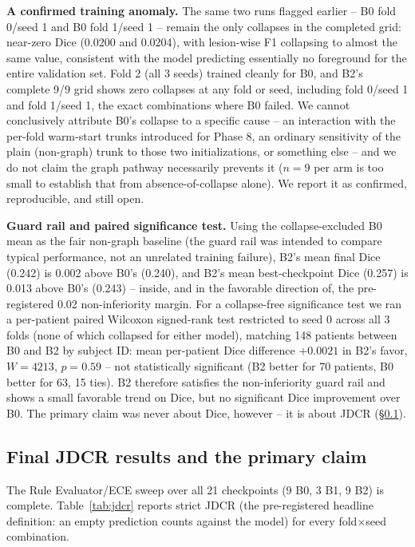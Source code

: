 \documentclass[conference]{IEEEtran}
\begin{document}
\textbf{A confirmed training anomaly.} The same two runs flagged earlier -- B0 fold 0/seed 1 and B0 fold 1/seed 1 -- remain the only collapses in the completed grid: near-zero Dice (0.0200 and 0.0204), with lesion-wise F1 collapsing to almost the same value, consistent with the model predicting essentially no foreground for the entire validation set. Fold 2 (all 3 seeds) trained cleanly for B0, and B2's complete 9/9 grid shows zero collapses at any fold or seed, including fold 0/seed 1 and fold 1/seed 1, the exact combinations where B0 failed. We cannot conclusively attribute B0's collapse to a specific cause -- an interaction with the per-fold warm-start trunks introduced for Phase 8, an ordinary sensitivity of the plain (non-graph) trunk to those two initializations, or something else -- and we do not claim the graph pathway necessarily prevents it ($n=9$ per arm is too small to establish that from absence-of-collapse alone). We report it as confirmed, reproducible, and still open.

\textbf{Guard rail and paired significance test.} Using the collapse-excluded B0 mean as the fair non-graph baseline (the guard rail was intended to compare typical performance, not an unrelated training failure), B2's mean final Dice (0.242) is 0.002 above B0's (0.240), and B2's mean best-checkpoint Dice (0.257) is 0.013 above B0's (0.243) -- inside, and in the favorable direction of, the pre-registered 0.02 non-inferiority margin. For a collapse-free significance test we ran a per-patient paired Wilcoxon signed-rank test restricted to seed 0 across all 3 folds (none of which collapsed for either model), matching 148 patients between B0 and B2 by subject ID: mean per-patient Dice difference $+0.0021$ in B2's favor, $W=4213$, $p=0.59$ -- not statistically significant (B2 better for 70 patients, B0 better for 63, 15 ties). B2 therefore satisfies the non-inferiority guard rail and shows a small favorable trend on Dice, but no significant Dice improvement over B0. The primary claim was never about Dice, however -- it is about JDCR (\S\ref{sec:jdcrfull}).

\subsection{Final JDCR results and the primary claim}
\label{sec:jdcrfull}

The Rule Evaluator/ECE sweep over all 21 checkpoints (9 B0, 3 B1, 9 B2) is complete. Table~\ref{tab:jdcr} reports strict JDCR (the pre-registered headline definition: an empty prediction counts against the model) for every fold$\times$seed combination.
\end{document}
